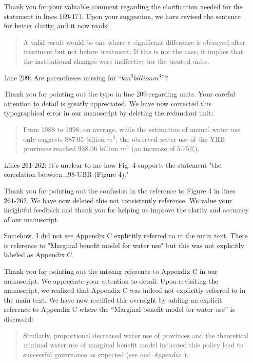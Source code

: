 \AR{} Thank you for your valuable comment regarding the clarification needed for the statement in lines 169-171. Upon your suggestion, we have revised the sentence for better clarity, and it now reads:

\begin{quote}
    A valid result would be one where a significant difference is observed after treatment but not before treatment. If this is not the case, it implies that the institutional changes were ineffective for the treated units.
\end{quote}

\RC{} Line 209: Are parentheses missing for ``$km^3 billion m^3$''?

\AR{} Thank you for pointing out the typo in line 209 regarding units. Your careful attention to detail is greatly appreciated. We have now corrected this typographical error in our manuscript by deleting the redundant unit:

\begin{quote}
    From 1988 to 1998, on average, while the estimation of annual water use only suggests $887.05$ billion $m^3$, the observed water use of the YRB provinces reached $938.06$ billion $m^3$ (an increase of $5.75\%$).
\end{quote}

\RC{} Lines 261-262: It's unclear to me how Fig. 4 supports the statement "the correlation between...98-UBR (Figure 4)."

\AR{} Thank you for pointing out the confusion in the reference to Figure 4 in lines 261-262. We have now deleted this not consistently reference. We value your insightful feedback and thank you for helping us improve the clarity and accuracy of our manuscript.

\RC{} Somehow, I did not see Appendix C explicitly referred to in the main text. There is reference to "Marginal benefit model for water use" but this was not explicitly labeled as Appendix C.

\AR{} Thank you for pointing out the missing reference to Appendix C in our manuscript. We appreciate your attention to detail. Upon revisiting the manuscript, we realized that Appendix C was indeed not explicitly referred to in the main text. We have now rectified this oversight by adding an explicit reference to Appendix C where the ``Marginal benefit model for water use'' is discussed:

\begin{quote}
    Similarly, proportional decreased water use of provinces and the theoretical minimal water use of marginal benefit model indicated this policy lead to successful governance as expected (see  and \textit{Appendix~}).
\end{quote}

